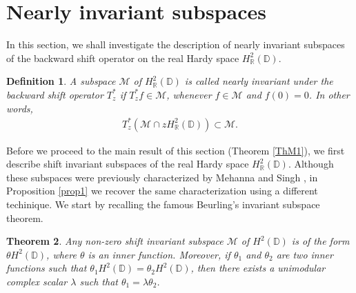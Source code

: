 \documentclass[11pt]{amsart}
\newtheorem{theorem}{Theorem}[section]
\newtheorem{definition}[theorem]{Definition}
\numberwithin{equation}{section}
\begin{document}
\section{Nearly invariant subspaces} \label{NIS}
In this section, we shall investigate the description of nearly invariant subspaces of the backward shift operator on the real Hardy space $H^2_\mathbb{R}(\mathbb{D})$.

\begin{definition}\label{defN}
 A subspace $\mathcal{M}$ of $H^2_{\mathbb{R}}(\mathbb{D})$ is called nearly invariant under the backward shift operator $T^*_z$ if $T^*_zf \in \mathcal{M}$, whenever $f \in \mathcal{M}$ and $f(0)=0$. In other words,
 \begin{eqnarray*}
     T^*_z(\mathcal{M}\cap zH^2_{\mathbb{R}}(\mathbb{D}))\subset \mathcal{M}.
 \end{eqnarray*}
 \end{definition}

Before we proceed to the main result of this section (Theorem \ref{ThM1}), we first describe shift invariant subspaces of the real Hardy space $H^2_\mathbb{R}(\mathbb{D})$. Although these subspaces were previously characterized by Mehanna and Singh \cite{MS}, in Proposition \ref{prop1} we recover the same characterization using a different techinique. We start by recalling the famous Beurling's invariant subspace theorem.

\begin{theorem}\label{BTH}
 Any non-zero shift invariant subspace $\mathcal{M}$ of $H^2(\mathbb{D})$ is of the form $\theta H^2(\mathbb{D})$, where $\theta$ is an inner function. Moreover, if $\theta_1$ and $\theta_2$ are two inner functions such that $\theta_1 H^2(\mathbb{D})=\theta_2 H^2(\mathbb{D})$, then there exists a unimodular complex scalar $\lambda$ such that $\theta_1=\lambda \theta_2$.    
\end{theorem}
\end{document}
